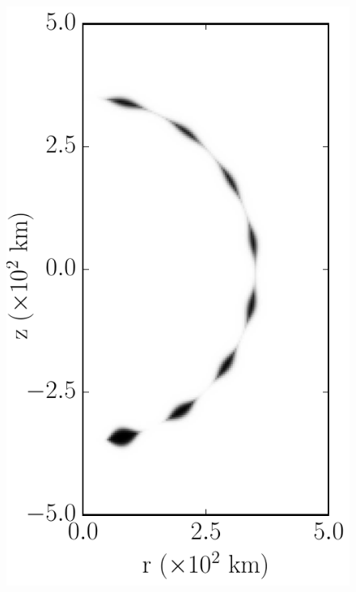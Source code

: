 \documentclass[iop,apj]{emulateapj}
\begin{document}
\begin{figure}[!ht]
  \begin{minipage}{0.24\textwidth}
    \includegraphics[width=\linewidth]{"figures/flash_simulations/delayed-core/mpole-16_amp-12/cone_400k_m16_a12_0000"}
  \end{minipage} \hfill
  \begin{minipage}{0.24\textwidth}

\end{minipage}
\end{figure}
\end{document}

